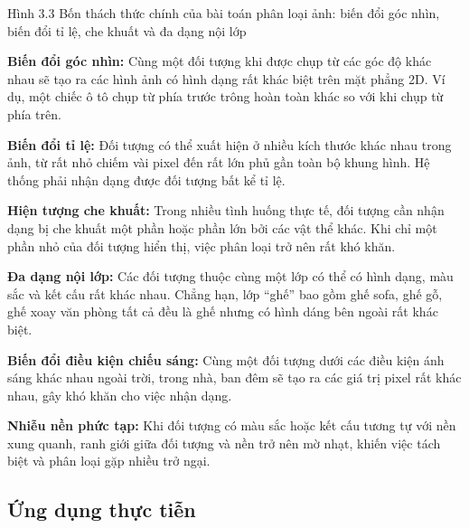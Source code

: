 \documentclass[
  12pt,
  a4paper,
]{report}
\begin{document}
\label{_Toc236751526}{}Hình 3.3 Bốn thách thức chính của
bài toán phân loại ảnh: biến đổi góc nhìn, biến đổi tỉ lệ, che khuất và
đa dạng nội lớp

\textbf{Biến đổi góc nhìn:} Cùng một đối tượng khi được chụp từ các góc
độ khác nhau sẽ tạo ra các hình ảnh có hình dạng rất khác biệt trên mặt
phẳng 2D. Ví dụ, một chiếc ô tô chụp từ phía trước trông hoàn toàn khác
so với khi chụp từ phía trên.

\textbf{Biến đổi tỉ lệ:} Đối tượng có thể xuất hiện ở nhiều kích thước
khác nhau trong ảnh, từ rất nhỏ chiếm vài pixel đến rất lớn phủ gần toàn
bộ khung hình. Hệ thống phải nhận dạng được đối tượng bất kể tỉ lệ.

\textbf{Hiện tượng che khuất:} Trong nhiều tình huống thực tế, đối tượng
cần nhận dạng bị che khuất một phần hoặc phần lớn bởi các vật thể khác.
Khi chỉ một phần nhỏ của đối tượng hiển thị, việc phân loại trở nên rất
khó khăn.

\textbf{Đa dạng nội lớp:} Các đối tượng thuộc cùng một lớp có thể có
hình dạng, màu sắc và kết cấu rất khác nhau. Chẳng hạn, lớp ``ghế'' bao
gồm ghế sofa, ghế gỗ, ghế xoay văn phòng tất cả đều là ghế nhưng có hình
dáng bên ngoài rất khác biệt.

\textbf{Biến đổi điều kiện chiếu sáng:} Cùng một đối tượng dưới các điều
kiện ánh sáng khác nhau ngoài trời, trong nhà, ban đêm sẽ tạo ra các giá
trị pixel rất khác nhau, gây khó khăn cho việc nhận dạng.

\textbf{Nhiễu nền phức tạp:} Khi đối tượng có màu sắc hoặc kết cấu tương
tự với nền xung quanh, ranh giới giữa đối tượng và nền trở nên mờ nhạt,
khiến việc tách biệt và phân loại gặp nhiều trở ngại.

\subsection{Ứng dụng thực
tiễn}\label{ux1ee9ng-dux1ee5ng-thux1ef1c-tiux1ec5n}
\end{document}

